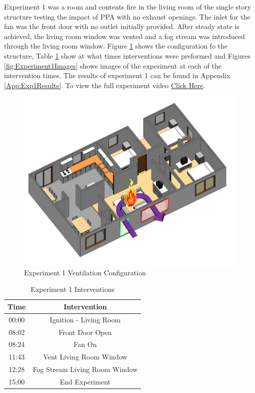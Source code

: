\documentclass{article}
\begin{document}
Experiment 1 was a room and contents fire in the living room of the single story structure testing the impact of PPA with no exhaust openings. The inlet for the fan was the front door with no outlet initially provided. After steady state is achieved, the living room window was vented and a fog stream was introduced through the living room window. Figure \ref{fig:Exp1VentConfig} shows the configuration fo the structure, Table \ref{Table:Exp1Interventions} show at what times interventions were preformed and Figures \ref{fig:Experiment1Images} shows images of the experiment at each of the intervention times. The results of experiment 1 can be found in Appendix \ref{App:Exp1Results}. To view the full experiment video \href{https://youtu.be/gl8rc1Nsl1k}{Click Here}.

\begin{figure}[H]
	\centering
	\includegraphics[width=5in]{0_Images/FireExperiments/Single_Story/Experiment_1.jpg}
	\caption{Experiment 1 Ventilation Configuration}
	\label{fig:Exp1VentConfig}
\end{figure}

\begin{table}[H]
	\centering
	\caption{Experiment 1 Interventions}
	\begin{tabular}{|c|c|} 
		\hline
		Time & Intervention \\ \hline \hline
		00:00 & Ignition - Living Room \\ \hline
		08:02 & Front Door Open \\ \hline
		08:24 & Fan On \\ \hline
		11:43 & Vent Living Room Window \\ \hline
		12:28 & Fog Stream Living Room Window \\ \hline
		15:00 & End Experiment\\ \hline
	\end{tabular}
	\label{Table:Exp1Interventions}
\end{table}
\end{document}
